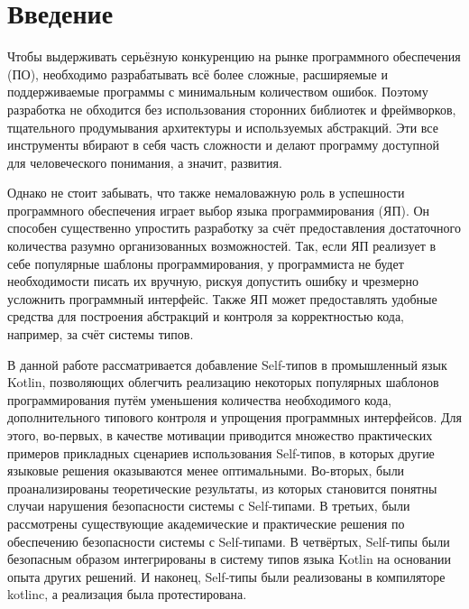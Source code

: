 \section*{Введение}

Чтобы выдерживать серьёзную конкуренцию на рынке программного обеспечения (ПО), необходимо разрабатывать всё более сложные, расширяемые и поддерживаемые программы с минимальным количеством ошибок.
Поэтому разработка не обходится без использования сторонних библиотек и фреймворков, тщательного продумывания архитектуры и используемых абстракций.
Эти все инструменты вбирают в себя часть сложности и делают программу доступной для человеческого понимания, а значит, развития.

Однако не стоит забывать, что также немаловажную роль в успешности программного обеспечения играет выбор языка программирования (ЯП).
Он способен существенно упростить разработку за счёт предоставления достаточного количества разумно организованных возможностей.
Так, если ЯП реализует в себе популярные шаблоны программирования, у программиста не будет необходимости писать их вручную, рискуя допустить ошибку и чрезмерно усложнить программный интерфейс.
Также ЯП может предоставлять удобные средства для построения абстракций и контроля за корректностью кода, например, за счёт системы типов.

В данной работе рассматривается добавление Self-типов в промышленный язык Kotlin, позволяющих облегчить реализацию некоторых популярных шаблонов программирования путём уменьшения количества необходимого кода, дополнительного типового контроля и упрощения программных интерфейсов.
Для этого, во-первых, в качестве мотивации приводится множество практических примеров прикладных сценариев использования Self-типов, в которых другие языковые решения оказываются менее оптимальными.
Во-вторых, были проанализированы теоретические результаты, из которых становится понятны случаи нарушения безопасности системы с Self-типами.
В третьих, были рассмотрены существующие академические и практические решения по обеспечению безопасности системы с Self-типами.
В четвёртых, Self-типы были безопасным образом интегрированы в систему типов языка Kotlin на основании опыта других решений.
И наконец, Self-типы были реализованы в компиляторе kotlinc, а реализация была протестирована.
